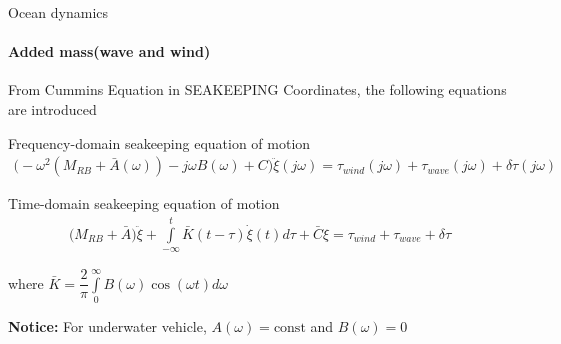 \begin{frame}{Ocean dynamics}
	\framesubtitle{Added mass(wave and wind)}
	From Cummins Equation in SEAKEEPING Coordinates, the following equations are introduced
	\begin{block}{Frequency-domain seakeeping equation of motion}
		\begin{align}
			\Big(-\omega^2(M_{RB} + \bar{A}(\omega
			)) - j\omega B(\omega) + C
			\Big)\ddot{\xi}(j\omega
			)= \tau_{wind}(j\omega)+ \tau_{wave}(j\omega) + \delta\tau(j\omega)
		\end{align}
	\end{block}
	
	\begin{block}{Time-domain seakeeping equation of motion}
		\begin{align}
			\Big(M_{RB} + \bar{A}\Big)\ddot{\xi} + \int\limits_{-\infty}^t \bar{K}(t - \tau)\dot{\xi}(t)d\tau + \bar{C}\xi = \tau_{wind} + \tau_{wave} + \delta\tau
		\end{align}
	\end{block}
	where $\bar{K} = \dfrac{2}{\pi}\int\limits_{0}^{\infty}B(\omega)\cos(\omega t)d\omega$
	
	\textbf{Notice:} For underwater vehicle, $A(\omega) = \text{const}$ and $B(\omega) = 0$
\end{frame}





